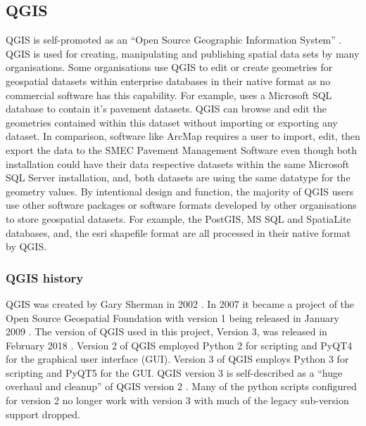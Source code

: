 \documentclass[letterpaper,10pt,english]{sphinxmanual}
\begin{document}
\subsection{QGIS}
\label{\detokenize{concept:qgis}}
QGIS is self-promoted as an “Open Source Geographic Information System” .  QGIS is used for creating, manipulating and publishing spatial data sets by many organisations.  Some organisations use QGIS to edit or create geometries for geospatial datasets within enterprise databases in their native format as no commercial software has this capability.  For example,  uses a Microsoft SQL database to contain it’s pavement datasets.  QGIS can browse and edit the geometries contained within this dataset without importing or exporting any dataset.   In comparison, software like ArcMap requires a user to import, edit, then export the data to the SMEC Pavement Management Software even though both installation could have their data respective datasets within the same Microsoft SQL Server installation, and, both datasets are using the same datatype for the geometry values.
By intentional design and function, the majority of QGIS users use other software packages or software formats developed by other organisations to store geospatial datasets.  For example, the PostGIS, MS SQL and SpatiaLite databases, and, the esri shapefile format are all processed in their native format by QGIS.


\subsubsection{QGIS history}
\label{\detokenize{concept:qgis-history}}
QGIS was created by Gary Sherman in 2002 .  In 2007 it became a project of the Open Source Geospatial Foundation with version 1 being released in January 2009 .  The version of QGIS used in this project, Version 3, was released in February 2018 .  Version 2 of QGIS employed Python 2 for scripting and PyQT4 for the graphical user interface (GUI).  Version 3 of QGIS employs Python 3 for scripting and PyQT5 for the GUI.  QGIS version 3 is self-described as a “huge overhaul and cleanup” of QGIS version 2 .  Many of the python scripts configured for version 2 no longer work with version 3 with much of the legacy sub-version support dropped.
\end{document}
